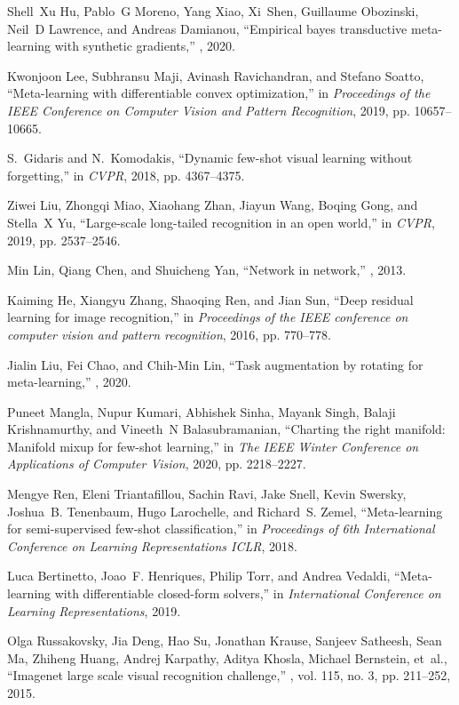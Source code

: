 \documentclass{article}
\begin{document}
\begin{thebibliography}{10}
Shell~Xu Hu, Pablo~G Moreno, Yang Xiao, Xi~Shen, Guillaume Obozinski, Neil~D
  Lawrence, and Andreas Damianou,
\newblock ``Empirical bayes transductive meta-learning with synthetic
  gradients,''
, 2020.

Kwonjoon Lee, Subhransu Maji, Avinash Ravichandran, and Stefano Soatto,
\newblock ``Meta-learning with differentiable convex optimization,''
\newblock in {\em Proceedings of the IEEE Conference on Computer Vision and
  Pattern Recognition}, 2019, pp. 10657--10665.

S.~Gidaris and N.~Komodakis,
\newblock ``Dynamic few-shot visual learning without forgetting,''
\newblock in {\em CVPR}, 2018, pp. 4367--4375.

Ziwei Liu, Zhongqi Miao, Xiaohang Zhan, Jiayun Wang, Boqing Gong, and Stella~X
  Yu,
\newblock ``Large-scale long-tailed recognition in an open world,''
\newblock in {\em CVPR}, 2019, pp. 2537--2546.

Min Lin, Qiang Chen, and Shuicheng Yan,
\newblock ``Network in network,''
, 2013.

Kaiming He, Xiangyu Zhang, Shaoqing Ren, and Jian Sun,
\newblock ``Deep residual learning for image recognition,''
\newblock in {\em Proceedings of the IEEE conference on computer vision and
  pattern recognition}, 2016, pp. 770--778.

Jialin Liu, Fei Chao, and Chih-Min Lin,
\newblock ``Task augmentation by rotating for meta-learning,''
, 2020.

Puneet Mangla, Nupur Kumari, Abhishek Sinha, Mayank Singh, Balaji
  Krishnamurthy, and Vineeth~N Balasubramanian,
\newblock ``Charting the right manifold: Manifold mixup for few-shot
  learning,''
\newblock in {\em The IEEE Winter Conference on Applications of Computer
  Vision}, 2020, pp. 2218--2227.

Mengye Ren, Eleni Triantafillou, Sachin Ravi, Jake Snell, Kevin Swersky,
  Joshua~B. Tenenbaum, Hugo Larochelle, and Richard~S. Zemel,
\newblock ``Meta-learning for semi-supervised few-shot classification,''
\newblock in {\em Proceedings of 6th International Conference on Learning
  Representations {ICLR}}, 2018.

Luca Bertinetto, Joao~F. Henriques, Philip Torr, and Andrea Vedaldi,
\newblock ``Meta-learning with differentiable closed-form solvers,''
\newblock in {\em International Conference on Learning Representations}, 2019.

Olga Russakovsky, Jia Deng, Hao Su, Jonathan Krause, Sanjeev Satheesh, Sean Ma,
  Zhiheng Huang, Andrej Karpathy, Aditya Khosla, Michael Bernstein, et~al.,
\newblock ``Imagenet large scale visual recognition challenge,''
, vol. 115, no. 3, pp.
  211--252, 2015.

\end{thebibliography}
 
\end{document}
